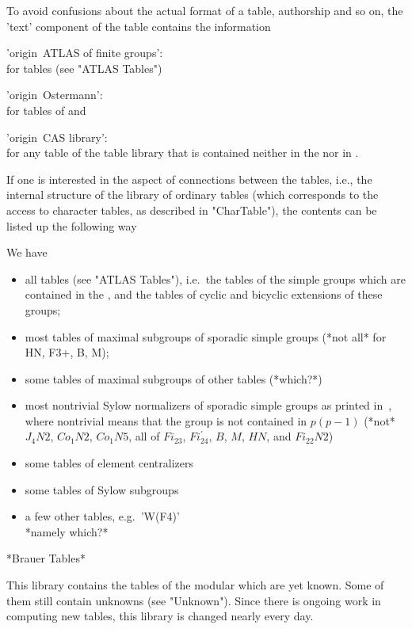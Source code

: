 To avoid confusions about the actual format of a table, authorship and so
on, the 'text' component of the table contains the information

'origin\:\ ATLAS of finite groups': \\
          for {\ATLAS} tables (see "ATLAS Tables")

'origin\:\ Ostermann': \\
          for tables of \cite{Ost86} and

'origin\:\ CAS library': \\
          for any table  of the  {\CAS}  table library  that is contained
          neither in the {\ATLAS} nor in \cite{Ost86}.

If  one is  interested in the  aspect  of connections between the tables,
i.e.,  the internal  structure of the  library of  ordinary tables (which
corresponds  to  the  access   to character   tables, as  described    in
"CharTable"), the contents can be listed up the following way\:

We have
\begin{itemize}
\item all {\ATLAS} tables  (see "ATLAS Tables"),  i.e.\ the tables of the
      simple groups  which are contained in the {\ATLAS},  and the tables
      of cyclic and bicyclic extensions of these groups;
\item most tables  of maximal subgroups  of sporadic simple groups  (*not
      all* for HN, F3+, B, M);
\item some   tables   of  maximal  subgroups  of  other  {\ATLAS}  tables
      (*which?*)
\item most  nontrivial  Sylow normalizers  of  sporadic  simple groups as
      printed in~\cite{Ost86},  where nontrivial  means that the group is
      not contained in $p$\:$(p-1)$   (*not* $J_4N2$, $Co_1N2$, $Co_1N5$,
      all  of  $Fi_{23}$,   $Fi_{24}^{\prime}$,   $B$,   $M$,  $HN$,  and
      $Fi_{22}N2$)
\item some tables of element centralizers
\item some tables of Sylow subgroups
\item a few other tables, e.g.\ 'W(F4)'\\
      {*namely which?*}
\end{itemize}

*Brauer Tables*

This library  contains the tables  of the modular  {\ATLAS} which are yet
known.  Some of them still contain unknowns (see "Unknown").  Since there
is ongoing  work in computing new tables,  this library is changed nearly
every day.

